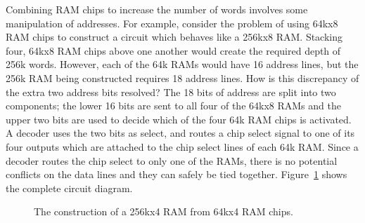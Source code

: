 Combining RAM chips to increase the number of words involves some manipulation
of addresses.  For example, consider the problem of using 64kx8 RAM chips to 
construct a circuit which behaves like a 256kx8 RAM.  Stacking four, 64kx8 RAM
chips above one another would create the required depth of 256k words.  However,
each of the 64k RAMs would have 16 address lines, but the 256k RAM being 
constructed requires 18 address lines.  How is this discrepancy of the extra 
two address bits resolved?  The 18 bits of address are split into two 
components; the lower 16 bits are sent to all four of the 64kx8 RAMs 
and the upper two bits are used to decide which of the four 64k RAM chips 
is activated.  A decoder uses
the two bits as select, and routes a chip select signal to one of its four outputs
which are attached to the chip select lines of each 64k RAM.  Since a decoder
routes the chip select to only one of the RAMs, there is no potential 
conflicts on the data lines and they can safely be tied together. 
Figure~\ref{fig:deep} shows the complete circuit diagram.

\begin{figure}[ht]

\caption{The construction of a 256kx4 RAM from 64kx4 RAM chips.}
\label{fig:deep}

\end{figure}

